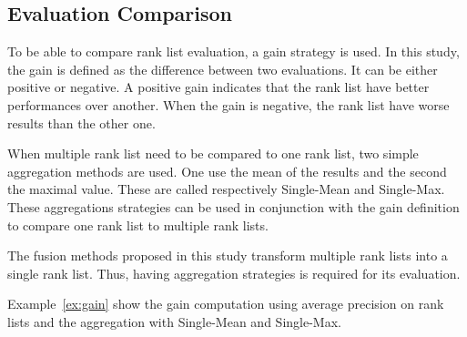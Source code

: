 \subsection{Evaluation Comparison~\label{sec:evaluation_comparison}}

To be able to compare rank list evaluation, a gain strategy is used.
In this study, the gain is defined as the difference between two evaluations.
It can be either positive or negative.
A positive gain indicates that the rank list have better performances over another.
When the gain is negative, the rank list have worse results than the other one.

When multiple rank list need to be compared to one rank list, two simple aggregation methods are used.
One use the mean of the results and the second the maximal value.
These are called respectively Single-Mean and Single-Max.
These aggregations strategies can be used in conjunction with the gain definition to compare one rank list to multiple rank lists.

The fusion methods proposed in this study transform multiple rank lists into a single rank list.
Thus, having aggregation strategies is required for its evaluation.

Example~\ref{ex:gain} show the gain computation using average precision on rank lists and the aggregation with Single-Mean and Single-Max.

